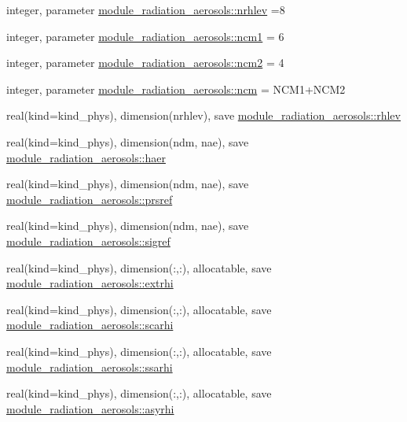 \begin{DoxyCompactItemize}
integer, parameter \hyperlink{group__module__radiation__aerosols_gaa6d18b0588e80cb40871cc75870d09ba}{module\+\_\+radiation\+\_\+aerosols\+::nrhlev} =8
\item 
integer, parameter \hyperlink{group__module__radiation__aerosols_gac6bc533a79d4b19129834cbc9a9fbc18}{module\+\_\+radiation\+\_\+aerosols\+::ncm1} = 6
\item 
integer, parameter \hyperlink{group__module__radiation__aerosols_ga61dbcce5b0bb02dd31d4a37983887a7b}{module\+\_\+radiation\+\_\+aerosols\+::ncm2} = 4
\item 
integer, parameter \hyperlink{group__module__radiation__aerosols_gab46e61a4a386794a5e9e97d8ef7d98a5}{module\+\_\+radiation\+\_\+aerosols\+::ncm} = N\+C\+M1+N\+C\+M2
\item 
real(kind=kind\+\_\+phys), dimension(nrhlev), save \hyperlink{group__module__radiation__aerosols_ga6aa3218393ea05cab77ab7867cfeab90}{module\+\_\+radiation\+\_\+aerosols\+::rhlev}
\item 
real(kind=kind\+\_\+phys), dimension(ndm, nae), save \hyperlink{group__module__radiation__aerosols_ga8ce24a58afb33dd372995bf5aaf95be9}{module\+\_\+radiation\+\_\+aerosols\+::haer}
\item 
real(kind=kind\+\_\+phys), dimension(ndm, nae), save \hyperlink{group__module__radiation__aerosols_ga274fad1b6e00e66375882e32494d61c0}{module\+\_\+radiation\+\_\+aerosols\+::prsref}
\item 
real(kind=kind\+\_\+phys), dimension(ndm, nae), save \hyperlink{group__module__radiation__aerosols_ga227ac7558dc0f33c34c34544771617ec}{module\+\_\+radiation\+\_\+aerosols\+::sigref}
\item 
real(kind=kind\+\_\+phys), dimension(\+:,\+:), allocatable, save \hyperlink{group__module__radiation__aerosols_ga40447f925f01790155c4d98ff8b0c04d}{module\+\_\+radiation\+\_\+aerosols\+::extrhi}
\item 
real(kind=kind\+\_\+phys), dimension(\+:,\+:), allocatable, save \hyperlink{group__module__radiation__aerosols_ga439929b1de549fadecc8537bae13e9de}{module\+\_\+radiation\+\_\+aerosols\+::scarhi}
\item 
real(kind=kind\+\_\+phys), dimension(\+:,\+:), allocatable, save \hyperlink{group__module__radiation__aerosols_gae4e1ead8bb34371c2d9f1b428846c10c}{module\+\_\+radiation\+\_\+aerosols\+::ssarhi}
\item 
real(kind=kind\+\_\+phys), dimension(\+:,\+:), allocatable, save \hyperlink{group__module__radiation__aerosols_gaac2d735c117dd7d1e72264e611764f79}{module\+\_\+radiation\+\_\+aerosols\+::asyrhi}

\end{DoxyCompactItemize}
